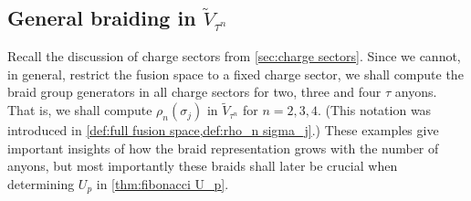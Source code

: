 \documentclass[a4paper,10pt,oneside]{book}
\theoremstyle{plain}
\theoremstyle{definition}
\theoremstyle{remark}
\begin{document}
\subsection{General braiding in \texorpdfstring{$\widetilde{V}_{τ^n}$}{V\~_(τⁿ)}}

Recall the discussion of charge sectors from \cref{sec:charge sectors}. Since we cannot, in general, restrict the fusion space to a fixed charge sector, we shall compute the braid group generators in all charge sectors for two, three and four $τ$ anyons. That is, we shall compute $ρ_n(σ_j)$ in $\widetilde{V}_{τ^n}$ for $n=2,3,4$. (This notation was introduced in \cref{def:full fusion space,def:rho_n sigma_j}.) These examples give important insights of how the braid representation grows with the number of anyons, but most importantly these braids shall later be crucial when determining $U_p$ in \cref{thm:fibonacci U_p}.
\end{document}
